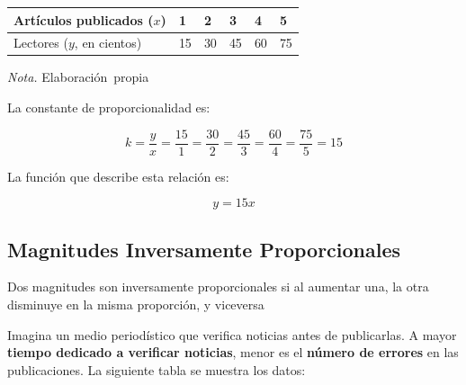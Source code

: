 \documentclass[
  stu,
  floatsintext,
  longtable,
  a4paper,
  nolmodern,
  notxfonts,
  notimes,
  12pt,
  colorlinks=true,linkcolor=blue,citecolor=blue,urlcolor=blue]{apa7}
\newcounter{none} %
\begin{document}
\begin{table}

{\caption{{Relación entre Artículos publicados y
Lectores}{\label{tbl-mytable8}}}}

{\def\LTcaptype{none} %
\begin{longtable}[]{@{}llllll@{}}
\toprule\noalign{}
Artículos publicados (\(x\)) & 1 & 2 & 3 & 4 & 5 \\
\midrule\noalign{}
\endhead
\bottomrule\noalign{}
\endlastfoot
Lectores (\(y\), en cientos) & 15 & 30 & 45 & 60 & 75 \\
\end{longtable}
}

\noindent \emph{Nota.} Elaboración~propia

\end{table}

La constante de proporcionalidad es:

\[
k = \frac{y}{x} = \frac{15}{1} = \frac{30}{2} = \frac{45}{3} = \frac{60}{4} = \frac{75}{5} = 15
\]

La función que describe esta relación es:

\[
y = 15x
\]

\subsection{Magnitudes Inversamente
Proporcionales}\label{magnitudes-inversamente-proporcionales}

Dos magnitudes son inversamente proporcionales si al aumentar una, la
otra disminuye en la misma proporción, y viceversa

Imagina un medio periodístico que verifica noticias antes de
publicarlas. A mayor \textbf{tiempo dedicado a verificar noticias},
menor es el \textbf{número de errores} en las publicaciones. La
siguiente tabla se muestra los datos:
\end{document}

